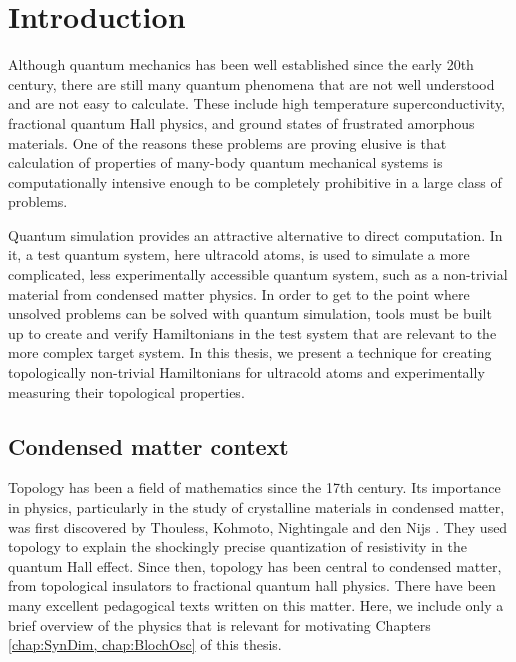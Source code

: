 \renewcommand{\thechapter}{1}

\chapter{Introduction}\label{chap:Chern}
Although quantum mechanics has been well established since the early 20th century, there are still many quantum phenomena that are not well understood and are not easy to calculate. These include high temperature superconductivity, fractional quantum Hall physics, and ground states of frustrated amorphous materials. One of the reasons these problems are proving elusive is that calculation of properties of many-body quantum mechanical systems is computationally intensive enough to be completely prohibitive in a large class of problems. 

Quantum simulation provides an attractive alternative to direct computation. In it, a test quantum system, here ultracold atoms, is used to simulate a more complicated, less experimentally accessible quantum system, such as a non-trivial material from condensed matter physics. In order to get to the point where unsolved problems can be solved with quantum simulation, tools must be built up to create and verify Hamiltonians in the test system that are relevant to the more complex target system. In this thesis, we present a technique for creating topologically non-trivial Hamiltonians for ultracold atoms and experimentally measuring their topological properties.

\section{Condensed matter context}
Topology has been a field of mathematics since the 17th century. Its importance in physics, particularly in the study of crystalline materials in condensed matter, was first discovered by Thouless, Kohmoto, Nightingale and den Nijs \cite{Thouless1982}. They used topology to explain the shockingly precise quantization of resistivity in the quantum Hall effect. Since then, topology has been central to condensed matter, from topological insulators\cite{Qi2011} to fractional quantum hall physics\cite{Stormer1999}. There have been many excellent pedagogical texts written on this matter. Here, we include only a brief overview of the physics that is relevant for motivating Chapters \ref{chap:SynDim, chap:BlochOsc} of this thesis.  

